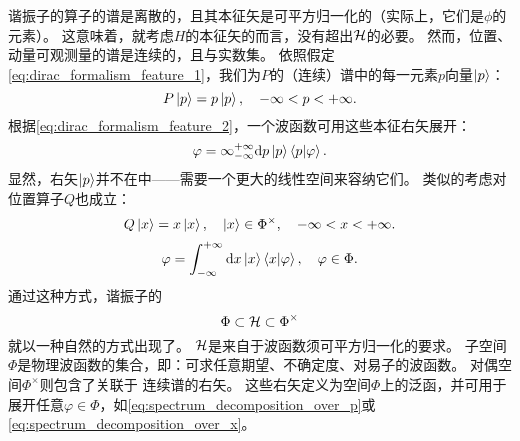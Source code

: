谐振子的\hamilton 算子的谱是离散的，且其本征矢是可平方归一化的（实际上，它们是\(\phi\)的元素）。
这意味着，就考虑\(H\)的本征矢的而言，没有超出\hs \(\mathcal H\)的必要。
然而，位置、动量可观测量的谱是连续的，且与实数集。
依照假定\cref{eq:dirac_formalism_feature_1}，我们为\(P\)的（连续）谱中的每一元素\(p\)向量\(\ket p\)：
\[P\ket p=p\ket p,\quad -\infty<p<+\infty.\]
根据\cref{eq:dirac_formalism_feature_2}，一个波函数可用这些本征右矢展开：
\[\label{eq:spectrum_decomposition_over_p}
	\varphi=\infty_{-\infty}^{+\infty}{\mathrm d} p\ket p\braket{p|\varphi}.\]
显然，右矢\(\ket p\)并不在\hs 中——需要一个更大的线性空间来容纳它们。
类似的考虑对位置算子\(Q\)也成立：
\[Q\ket x=x\ket x,\quad \ket x\in\Phi^\times,\quad -\infty<x<+\infty.\]
\[\label{eq:spectrum_decomposition_over_x}
	\varphi=\int_{-\infty}^{+\infty}{\mathrm d} x\ket x\braket{x|\varphi},\quad\varphi\in\Phi.\]
通过这种方式，谐振子的\gelfandtriplet
\[\Phi\subset\mathcal H\subset\Phi^\times\]
就以一种自然的方式出现了。
\hs\(\mathcal H\)是来自于波函数须可平方归一化的要求。
子空间\(\Phi\)是物理波函数的集合，即：可求任意期望、不确定度、对易子的波函数。
对偶空间\(\Phi^\times\)则包含了关联于%
连续谱的右矢。
这些右矢定义为空间\(\Phi\)上的泛函，并可用于展开任意\(\varphi\in\Phi\)，如\cref{eq:spectrum_decomposition_over_p}或\cref{eq:spectrum_decomposition_over_x}。

